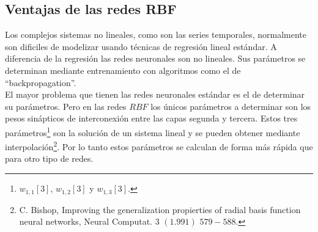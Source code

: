 %
%

\subsection{Ventajas de las redes RBF}

Los complejos sistemas no lineales, como son las series temporales, normalmente
son dificiles de modelizar usando t\'ecnicas de regresi\'on lineal est\'andar.
A diferencia de la regresi\'on las redes neuronales son no lineales. Sus
par\'ametros se determinan mediante entrenamiento con algoritmos como el de
``backpropagation''.\\

El mayor problema que tienen las redes neuronales est\'andar es el de determinar
su par\'ametros. Pero en las redes $RBF$ los \'unicos par\'ametros a determinar
son los pesos sin\'apticos de interconexi\'on entre las capas segunda y tercera.
Estos tres par\'ametros\footnote{$w_{1,1}[3]$, $w_{1,2}[3]$ y $w_{1,3}[3]$.}
son la soluci\'on de un sistema lineal y se pueden obtener mediante
interpolaci\'on\footnote{C. Bishop, Improving the generalization propierties of
radial basis function neural networks, Neural Computat. $3$ $(1.991)$
$579-588$.}. Por lo tanto estos par\'ametros se calculan de forma m\'as r\'apida
que para otro tipo de redes.
